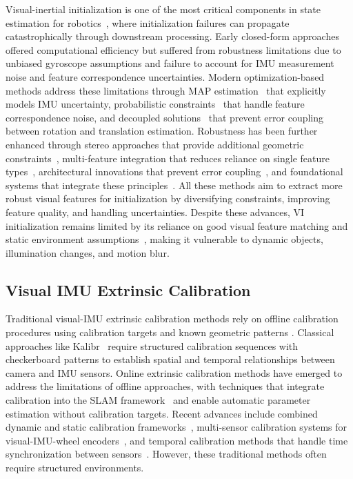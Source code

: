 Visual-inertial initialization is one of the most critical components in state estimation for robotics~\cite{qin2018vins,campos2021orb}, where initialization failures can propagate catastrophically through downstream processing.
Early closed-form approaches~\cite{martinelli2013closed,kaiser2017simultaneous,zuniga2020analytical} offered computational efficiency but suffered from robustness limitations due to unbiased gyroscope assumptions and failure to account for IMU measurement noise and feature correspondence uncertainties.
Modern optimization-based methods address these limitations through MAP estimation~\cite{campos2021orb} that explicitly models IMU uncertainty, probabilistic constraints~\cite{mu2025robust} that handle feature correspondence noise, and decoupled solutions~\cite{he2023rotation} that prevent error coupling between rotation and translation estimation.
Robustness has been further enhanced through stereo approaches that provide additional geometric constraints~\cite{wang2024stereo,eta2024init}, multi-feature integration that reduces reliance on single feature types~\cite{ple2024slam}, architectural innovations that prevent error coupling~\cite{edi2023eskf,parallel2022robust}, and foundational systems that integrate these principles~\cite{qin2018vins,geneva2020openvins,mur2017visual}.
All these methods aim to extract more robust visual features for initialization by diversifying constraints, improving feature quality, and handling uncertainties.
Despite these advances, VI initialization remains limited by its reliance on good visual feature matching and static environment assumptions~\cite{fast2019robust}, making it vulnerable to dynamic objects, illumination changes, and motion blur.

\subsection{Visual IMU Extrinsic Calibration}
Traditional visual-IMU extrinsic calibration methods rely on offline calibration procedures using calibration targets and known geometric patterns \cite{furgale2013unified}.
Classical approaches like Kalibr~\cite{furgale2013unified} require structured calibration sequences with checkerboard patterns to establish spatial and temporal relationships between camera and IMU sensors.
Online extrinsic calibration methods have emerged to address the limitations of offline approaches, with techniques that integrate calibration into the SLAM framework~\cite{huang2018online} and enable automatic parameter estimation without calibration targets.
Recent advances include combined dynamic and static calibration frameworks~\cite{wang2025dynamic}, multi-sensor calibration systems for visual-IMU-wheel encoders~\cite{qiao2023viw}, and temporal calibration methods that handle time synchronization between sensors~\cite{petit2020time}.
However, these traditional methods often require structured environments.

